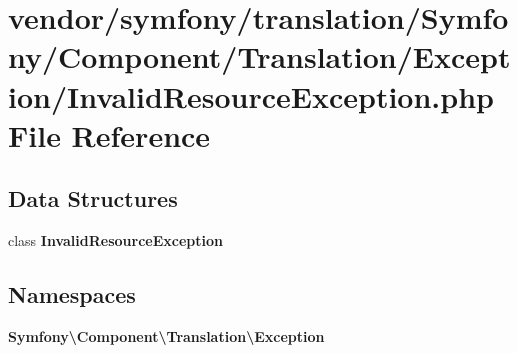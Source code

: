\section{vendor/symfony/translation/\+Symfony/\+Component/\+Translation/\+Exception/\+Invalid\+Resource\+Exception.php File Reference}
\label{_invalid_resource_exception_8php}
\subsection*{Data Structures}
\begin{DoxyCompactItemize}
\item 
class {\bf Invalid\+Resource\+Exception}
\end{DoxyCompactItemize}
\subsection*{Namespaces}
\begin{DoxyCompactItemize}
\item 
 {\bf Symfony\textbackslash{}\+Component\textbackslash{}\+Translation\textbackslash{}\+Exception}
\end{DoxyCompactItemize}
